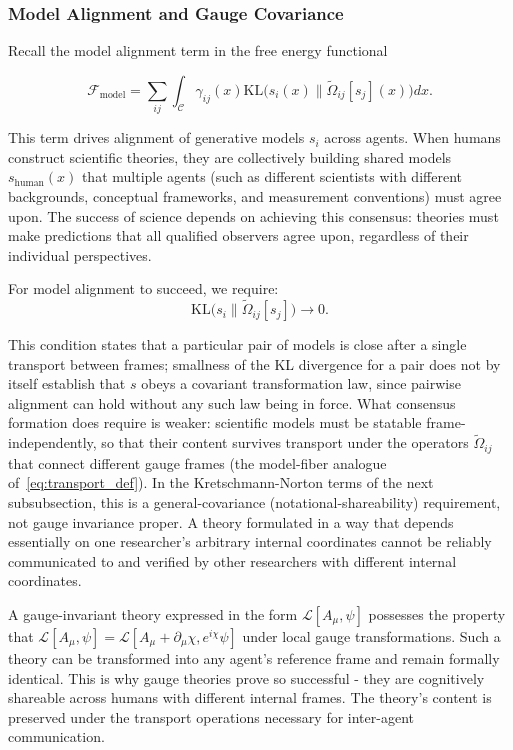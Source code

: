 \documentclass[11pt]{article}
\begin{document}
\subsubsection{Model Alignment and Gauge Covariance}

Recall the model alignment term in the free energy functional

\begin{equation}
\mathcal{F}_{\text{model}} = \sum_{ij} \int_{\mathcal{C}} \gamma_{ij}(x)  \mathrm{KL}\big(s_i(x) \| \tilde{\Omega}_{ij}[s_j](x)\big)  dx.
\end{equation}

This term drives alignment of generative models $s_i$ across agents. When humans construct scientific theories, they are collectively building shared models $s_{\text{human}}(x)$ that multiple agents (such as different scientists with different backgrounds, conceptual frameworks, and measurement conventions) must agree upon. The success of science depends on achieving this consensus: theories must make predictions that all qualified observers agree upon, regardless of their individual perspectives.

For model alignment to succeed, we require:
\begin{equation}
\mathrm{KL}\big(s_i \| \tilde{\Omega}_{ij}[s_j]\big) \to 0.
\end{equation}

This condition states that a particular pair of models is close after a single transport between frames; smallness of the KL divergence for a pair does not by itself establish that $s$ obeys a covariant transformation law, since pairwise alignment can hold without any such law being in force. What consensus formation does require is weaker: scientific models must be statable frame-independently, so that their content survives transport under the operators $\tilde{\Omega}_{ij}$ that connect different gauge frames (the model-fiber analogue of~\eqref{eq:transport_def}). In the Kretschmann-Norton terms of the next subsubsection, this is a general-covariance (notational-shareability) requirement, not gauge invariance proper. A theory formulated in a way that depends essentially on one researcher's arbitrary internal coordinates cannot be reliably communicated to and verified by other researchers with different internal coordinates.

A gauge-invariant theory expressed in the form $\mathcal{L}[A_\mu, \psi]$ possesses the property that $\mathcal{L}[A_\mu, \psi] = \mathcal{L}[A_\mu + \partial_\mu\chi, e^{i\chi}\psi]$ under local gauge transformations. Such a theory can be transformed into any agent's reference frame and remain formally identical. This is why gauge theories prove so successful - they are cognitively shareable across humans with different internal frames. The theory's content is preserved under the transport operations necessary for inter-agent communication.
\end{document}
